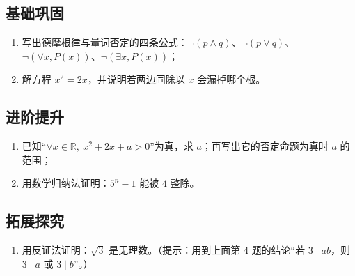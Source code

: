 \begin{afterclass}
\subsection*{基础巩固}

\begin{enumerate}
  \item 写出德摩根律与量词否定的四条公式：$\neg(p\land q)$、$\neg(p\lor q)$、$\neg(\forall x,P(x))$、$\neg(\exists x,P(x))$；
  \item 解方程 $x^2=2x$，并说明若两边同除以 $x$ 会漏掉哪个根。
\end{enumerate}

\subsection*{进阶提升}
\begin{enumerate}
  \item 已知“$\forall x\in\mathbb{R},\ x^2+2x+a>0$”为真，求 $a$；再写出它的否定命题为真时 $a$ 的范围；
  \item 用数学归纳法证明：$5^n-1$ 能被 $4$ 整除。
\end{enumerate}

\subsection*{拓展探究}
\begin{enumerate}
  \item 用反证法证明：$\sqrt3$ 是无理数。（提示：用到上面第 4 题的结论“若 $3\mid ab$，则 $3\mid a$ 或 $3\mid b$”。）
\end{enumerate}


\end{afterclass}

